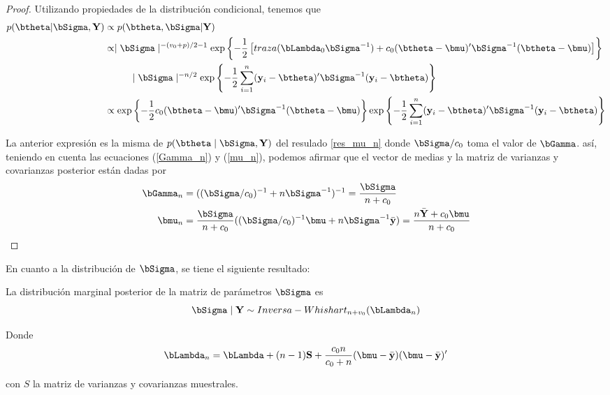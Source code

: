 \documentclass[10pt,openright]{book}\usepackage[]{graphicx}\usepackage[]{color}
\begin{document}
\begin{proof}
Utilizando propiedades de la distribuci\'on condicional, tenemos que
\begin{align*}
p(\btheta|\bSigma,\mathbf{Y})&\propto p(\btheta, \bSigma|\mathbf{Y})\\
&\propto \mid \bSigma \mid ^{-(v_0+p)/2-1}
\exp\left\{ -\frac{1}{2}\left[traza(\bLambda_0\bSigma^{-1})+
c_0(\btheta-\bmu)'\bSigma^{-1}(\btheta-\bmu)\right]\right\}\\
&\ \ \ \ \ \ \ \ \mid \bSigma \mid ^{-n/2}\exp\left\{-\frac{1}{2}\sum_{i=1}^n(\mathbf{y}_i-\btheta)'\bSigma^{-1}(\mathbf{y}_i-\btheta)\right\}\\
&\propto \exp\left\{ -\frac{1}{2}
c_0(\btheta-\bmu)'\bSigma^{-1}(\btheta-\bmu)\right\}\exp\left\{-\frac{1}{2}\sum_{i=1}^n(\mathbf{y}_i-\btheta)'\bSigma^{-1}(\mathbf{y}_i-\btheta)\right\}
\end{align*}

La anterior expresi\'on es la misma de $p(\btheta\mid\bSigma,\mathbf{Y})$ del resulado \ref{res_mu_n} donde $\bSigma/c_0$ toma el valor de $\bGamma$. as\'i, teniendo en cuenta las ecuaciones (\ref{Gamma_n}) y (\ref{mu_n}), podemos afirmar que el vector de medias y la matriz de varianzas y covarianzas posterior est\'an dadas por
\begin{align}
\bGamma_n&=((\bSigma/c_0)^{-1}+n\bSigma^{-1})^{-1}=\frac{\bSigma}{n+c_0}\\
\bmu_n&=\frac{\bSigma}{n+c_0}((\bSigma/c_0)^{-1}\bmu+n\bSigma^{-1}\bar{\mathbf{y}})=\frac{n\bar{\mathbf{Y}}+c_0\bmu}{n+c_0}
\end{align}
\end{proof}

En cuanto a la distribuci\'on de $\bSigma$, se tiene el siguiente resultado: 
\begin{Res}\label{Pos_Sigma}
La distribuci\'on marginal posterior de la matriz de par\'ametros $\bSigma$ es
\begin{equation*}
\bSigma \mid \mathbf{Y} \sim Inversa-Whishart_{n+v_0}(\bLambda_n)
\end{equation*}

Donde
\begin{equation}\label{bLambda_n}
\bLambda_n=\bLambda+(n-1)\mathbf{S}+\frac{c_0n}{c_0+n}(\bmu-\bar{\mathbf{y}})(\bmu-\bar{\mathbf{y}})'
\end{equation}

con $S$ la matriz de varianzas y covarianzas muestrales.
\end{Res}
\end{document}
